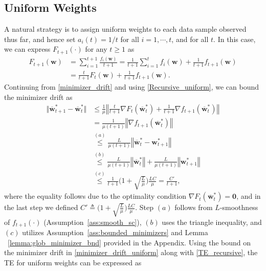 \documentclass[conference]{IEEEtran}
\begin{document}
\subsection{Uniform Weights}
A natural strategy is to assign uniform weights to each data sample observed thus far, and hence set $a_i(t) = 1/t$ for all $i = 1,\cdots,t$, and for all $t$. In this case, we can express $F_{t+1}(\cdot)$ for any $t \geq 1$ as
\begin{align}
    F_{t+1}(\mathbf{w}) &= \sum_{i=1}^{t+1} \frac{f_i(\mathbf{w})}{t+1}     \nonumber
    =  \frac{1}{t+1} \sum_{i=1}^t  f_i(\mathbf{w}) + \frac{1}{t+1} f_{t+1}(\mathbf{w})\nonumber\\
    &= \frac{t}{t+1} F_t(\mathbf{w}) + \frac{1}{t+1}f_{t+1}(\mathbf{w}). \label{Recursive_uniform}
\end{align}
Continuing from \eqref{minimizer_drift} and using \eqref{Recursive_uniform}, we can bound the minimizer drift %
as
\begin{align}
    \Vert  \overline{\mathbf{w}}^*_{t+1} - \overline{\mathbf{w}}^*_{t} \Vert  &\leq \frac{1}{\mu} \left\Vert \frac{t}{t+1} \nabla F_t(\overline{\mathbf{w}}^*_{t}) + \frac{1}{t+1}\nabla f_{t+1}(\overline{\mathbf{w}}^*_{t})\right\Vert \nonumber \\
    &= \frac{1}{\mu(t+1)} \left\Vert \nabla f_{t+1}(\overline{\mathbf{w}}^*_{t})\right\Vert \nonumber  \\
     &\overset{(a)}{\leq} \frac{L}{\mu(t+1)} \left\Vert \overline{\mathbf{w}}^*_{t} -\mathbf{w}_{t+1}^*\right\Vert \nonumber\\
     &\overset{(b)}{\leq} \frac{L}{\mu(t+1)} \left\Vert \overline{\mathbf{w}}^*_{t}\right\Vert + \frac{L}{\mu(t+1)} \left\Vert\mathbf{w}_{t+1}^*\right\Vert \nonumber\\
     &\overset{(c)}{\leq}  \frac{1}{t+1} \bigg(1 + \sqrt{\frac{L}{\mu}}\bigg) \frac{L C}{\mu}=\frac{C'}{t+1},\label{minimizer_drift_uniform}
\end{align}
where the equality follows due to the optimality condition $ \nabla F_{t}( \overline{\mathbf{w}}^*_{t}) = \mathbf{0}$,
and in the last step we defined $C' \triangleq \Big(1{+} \sqrt{\frac{L}{\mu}}\Big) \frac{L C}{\mu}$.
 Step $(a)$ follows from $L$-smoothness of $f_{t+1}(\cdot)$ (Assumption~\ref{ass:smooth_sc}), $(b)$ uses the triangle inequality, and $(c)$ utilizes Assumption~\ref{ass:bounded_minimizers} and Lemma ~\ref{lemma:glob_minimizer_bnd} provided in the Appendix. Using the bound on the minimizer drift in \eqref{minimizer_drift_uniform} along with \eqref{TE_recursive}, the TE for uniform weights can be expressed as 
\end{document}
